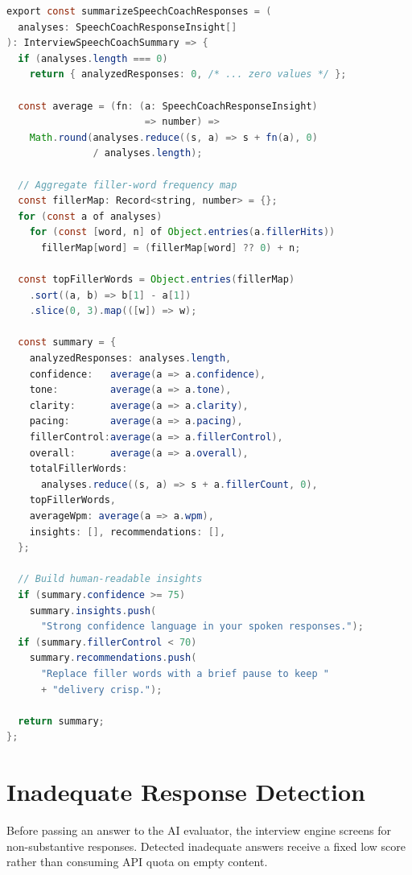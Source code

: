 \begin{lstlisting}[language=Java,
  caption={Session-level speech-coach summary
           (\texttt{lib/speech/coach.ts})},
  label={lst:speechSummary}]
export const summarizeSpeechCoachResponses = (
  analyses: SpeechCoachResponseInsight[]
): InterviewSpeechCoachSummary => {
  if (analyses.length === 0)
    return { analyzedResponses: 0, /* ... zero values */ };

  const average = (fn: (a: SpeechCoachResponseInsight)
                        => number) =>
    Math.round(analyses.reduce((s, a) => s + fn(a), 0)
               / analyses.length);

  // Aggregate filler-word frequency map
  const fillerMap: Record<string, number> = {};
  for (const a of analyses)
    for (const [word, n] of Object.entries(a.fillerHits))
      fillerMap[word] = (fillerMap[word] ?? 0) + n;

  const topFillerWords = Object.entries(fillerMap)
    .sort((a, b) => b[1] - a[1])
    .slice(0, 3).map(([w]) => w);

  const summary = {
    analyzedResponses: analyses.length,
    confidence:   average(a => a.confidence),
    tone:         average(a => a.tone),
    clarity:      average(a => a.clarity),
    pacing:       average(a => a.pacing),
    fillerControl:average(a => a.fillerControl),
    overall:      average(a => a.overall),
    totalFillerWords:
      analyses.reduce((s, a) => s + a.fillerCount, 0),
    topFillerWords,
    averageWpm: average(a => a.wpm),
    insights: [], recommendations: [],
  };

  // Build human-readable insights
  if (summary.confidence >= 75)
    summary.insights.push(
      "Strong confidence language in your spoken responses.");
  if (summary.fillerControl < 70)
    summary.recommendations.push(
      "Replace filler words with a brief pause to keep "
      + "delivery crisp.");

  return summary;
};
\end{lstlisting}

\section{Inadequate Response Detection}
\label{app:inadequate}

Before passing an answer to the AI evaluator, the interview engine screens for
non-substantive responses.  Detected inadequate answers receive a fixed low
score rather than consuming API quota on empty content.

